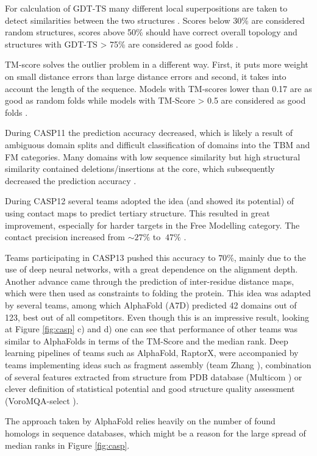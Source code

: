 For calculation of GDT-TS many different local superpositions are taken to detect similarities between the two structures \cite{gdt1}. Scores below 30\% are considered random structures, scores above 50\% should have correct overall topology and structures with GDT-TS > 75\% are considered as good folds \cite{casp13}.

TM-score solves the outlier problem in a different way. First, it puts more weight on small distance errors than large distance errors and second, it takes into account the length of the sequence. Models with TM-scores lower than 0.17 are as good as random folds while models with TM-Score > 0.5 are considered as good folds \cite{tmscore}.

During CASP11 the prediction accuracy decreased, which is likely a result of ambiguous domain splits and difficult classification of domains into the TBM and FM categories. Many domains with low sequence similarity but high structural similarity contained deletions/insertions at the core, which subsequently decreased the prediction accuracy \cite{casp11}.

During CASP12 several teams adopted the idea (and showed its potential) of using contact maps to predict tertiary structure. This resulted in great improvement, especially for harder targets in the Free Modelling category. The contact precision increased from $\sim 27\%$ to $~47\%$ \cite{casp12}.

Teams participating in CASP13 pushed this accuracy to $70\%$, mainly due to the use of deep neural networks, with a great dependence on the alignment depth. Another advance came through the prediction of inter-residue distance maps, which were then used as constraints to folding the protein. This idea was adapted by several teams, among which AlphaFold (A7D) predicted 42 domains out of 123, best out of all competitors. Even though this is an impressive result, looking at Figure \ref{fig:casp} c) and d) one can see that performance of other teams was similar to AlphaFolds in terms of the TM-Score and the median rank. Deep learning pipelines of teams such as AlphaFold, RaptorX, were accompanied by teams implementing ideas such as fragment assembly (team Zhang \cite{zhang}), combination of several features extracted from structure from PDB database (Multicom \cite{multicom0}) or clever definition of statistical potential and good structure quality assessment (VoroMQA-select \cite{voromqa}).

The approach taken by AlphaFold relies heavily on the number of found homologs in sequence databases, which might be a reason for the large spread of median ranks in Figure \ref{fig:casp}.

